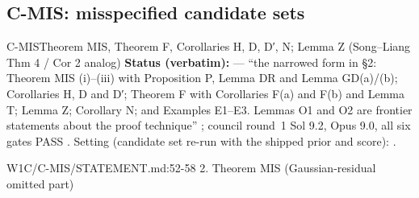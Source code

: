 \subsection{C-MIS: misspecified candidate sets}\label{sec:loop:mis}
\begin{card}{C-MIS}{Theorem MIS, Theorem F, Corollaries H, D, D′, N; Lemma Z (Song–Liang Thm 4 / Cor 2 analog)}
\textbf{Status (verbatim):}  — ``the narrowed form in §2: Theorem MIS (i)–(iii) with Proposition P, Lemma DR and Lemma GD(a)/(b); Corollaries H, D and D′; Theorem F with Corollaries F(a) and F(b) and Lemma T; Lemma Z; Corollary N; and Examples E1–E3. Lemmas O1 and O2 are frontier statements about the proof technique'' ; council round~1 Sol 9.2, Opus 9.0, all six gates PASS . Setting (candidate set re-run with the shipped prior and score): .
\begin{stmt}{W1C/C-MIS/STATEMENT.md:52-58}
2. Theorem MIS (Gaussian-residual omitted part)


\end{stmt}
\end{card}
